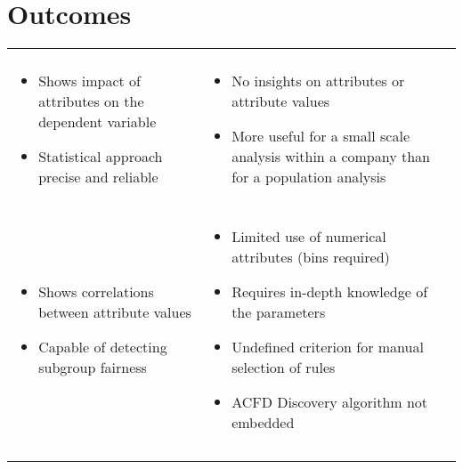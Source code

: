 \section{Outcomes}
\label{section:outcomes}
\begin{table}[t!]
\begin{tabularx}{\columnwidth}{|>{\RaggedRight\arraybackslash}Y>{\RaggedRight\arraybackslash}Y|}
\hline
{} & \\
\hline
{}\\
\hline
\begin{itemize}[noitemsep,topsep=0pt,parsep=0pt,partopsep=0pt,leftmargin=*]
\item Shows impact of attributes on the dependent variable
\item Statistical approach precise and reliable
\end{itemize} & \begin{itemize}[noitemsep,topsep=0pt,parsep=0pt,partopsep=0pt,leftmargin=*]
\item No insights on attributes or attribute values
\item More useful for a small scale analysis within a company than for a population analysis
\end{itemize}\\
\hline
{}\\
\hline
\begin{itemize}[noitemsep,topsep=0pt,parsep=0pt,partopsep=0pt,leftmargin=*]
\item Shows correlations between attribute values
\item Capable of detecting subgroup fairness
\end{itemize} & \begin{itemize}[noitemsep,topsep=0pt,parsep=0pt,partopsep=0pt,leftmargin=*]
\item Limited use of numerical attributes (bins required)
\item Requires in-depth knowledge of the parameters
\item Undefined criterion for manual selection of rules
\item ACFD Discovery algorithm not embedded
\end{itemize}\\
\hline
{}\\
\hline
\begin{itemize}[noitemsep,topsep=0pt,parsep=0pt,partopsep=0pt,leftmargin=*]

\end{itemize}
\end{tabularx}
\end{table}
